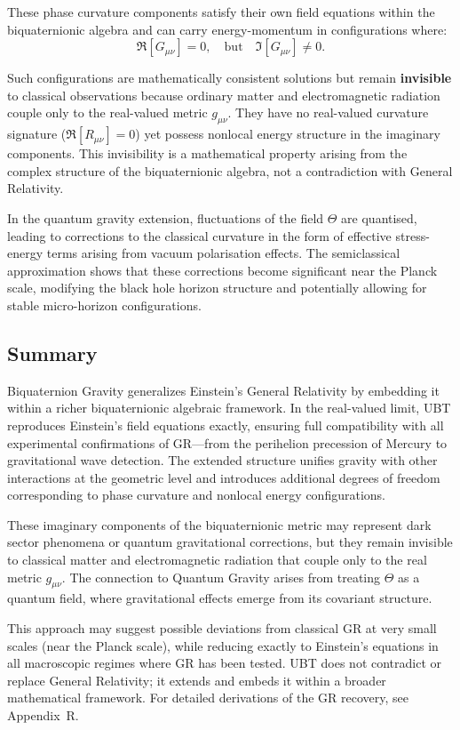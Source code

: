 These phase curvature components satisfy their own field equations within the biquaternionic 
algebra and can carry energy-momentum in configurations where:
\begin{equation}
\Re[G_{\mu\nu}] = 0, \quad \text{but} \quad \Im[G_{\mu\nu}] \neq 0.
\end{equation}

Such configurations are mathematically consistent solutions but remain \textbf{invisible} to 
classical observations because ordinary matter and electromagnetic radiation couple only to the 
real-valued metric $g_{\mu\nu}$. They have no real-valued curvature signature ($\Re[R_{\mu\nu}] = 0$) 
yet possess nonlocal energy structure in the imaginary components. This invisibility is a 
mathematical property arising from the complex structure of the biquaternionic algebra, not a 
contradiction with General Relativity.

In the quantum gravity extension, fluctuations of the field $\Theta$ are quantised,
leading to corrections to the classical curvature in the form of effective stress-energy
terms arising from vacuum polarisation effects. The semiclassical approximation shows that
these corrections become significant near the Planck scale, modifying the black hole
horizon structure and potentially allowing for stable micro-horizon configurations.

\subsection{Summary}

Biquaternion Gravity generalizes Einstein's General Relativity by embedding it within a
richer biquaternionic algebraic framework. In the real-valued limit, UBT reproduces 
Einstein's field equations exactly, ensuring full compatibility with all experimental 
confirmations of GR—from the perihelion precession of Mercury to gravitational wave 
detection. The extended structure unifies gravity with other interactions at the
geometric level and introduces additional degrees of freedom corresponding to phase 
curvature and nonlocal energy configurations.

These imaginary components of the biquaternionic metric may represent dark sector 
phenomena or quantum gravitational corrections, but they remain invisible to classical 
matter and electromagnetic radiation that couple only to the real metric $g_{\mu\nu}$. 
The connection to Quantum Gravity arises from treating $\Theta$ as a quantum field, 
where gravitational effects emerge from its covariant structure. 

This approach may suggest possible deviations from classical GR at very small scales 
(near the Planck scale), while reducing exactly to Einstein's equations in all 
macroscopic regimes where GR has been tested. UBT does not contradict or replace 
General Relativity; it extends and embeds it within a broader mathematical framework. 
For detailed derivations of the GR recovery, see Appendix~R.
